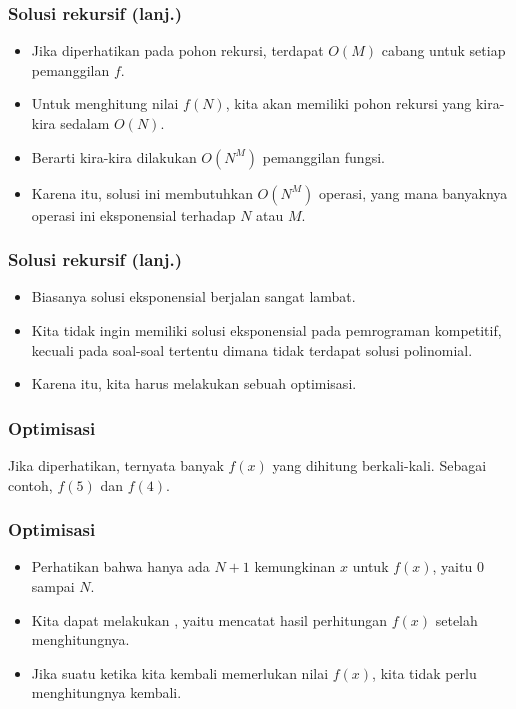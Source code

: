 \begin{frame}
\frametitle{Solusi rekursif (lanj.)}
\begin{itemize}
  \item Jika diperhatikan pada pohon rekursi, terdapat $O(M)$ cabang untuk setiap pemanggilan $f$.
  \item Untuk menghitung nilai $f(N)$, kita akan memiliki pohon rekursi yang kira-kira sedalam $O(N)$.
  \item Berarti kira-kira dilakukan $O(N^M)$ pemanggilan fungsi.
  \item Karena itu, solusi ini membutuhkan $O(N^M)$ operasi, yang mana banyaknya operasi ini eksponensial terhadap $N$ atau $M$.
\end{itemize}
\end{frame}

\begin{frame}
\frametitle{Solusi rekursif (lanj.)}
\begin{itemize}
  \item Biasanya solusi eksponensial berjalan sangat lambat.
  \item Kita tidak ingin memiliki solusi eksponensial pada pemrograman kompetitif, kecuali pada soal-soal tertentu dimana tidak terdapat solusi polinomial. 
  \item Karena itu, kita harus melakukan sebuah optimisasi.
\end{itemize}
\end{frame}

\begin{frame}
\frametitle{Optimisasi}
Jika diperhatikan, ternyata banyak $f(x)$ yang dihitung berkali-kali. Sebagai contoh, $f(5)$ dan $f(4)$.
\begin{center}
\scalebox{0.8}{
\Tree [.$f(12)$
  [.$f(2)$
    [.$f(1)$
      [.$f(0)$ ]
    ]
  ]
  [.$f(6)$
    [.$f(0)$ ]
    [.$f(5)$
      [.$f(4)$
        [.$...$
        ]
      ]
    ]
  ]
  [.$f(11)$
    [.$f(1)$
      [.$f(0)$ ]
    ]
    [.$f(5)$
      [.$f(4)$
        [.$...$          
        ]
      ]
    ]
    [.$f(10)$ 
      [.$f(0)$ 
        [.$...$ ]      
      ]
      [.$f(4)$ 
        [.$...$ ]      
      ]
      [.$f(9)$ 
        [.$...$ ]      
      ]
    ]
  ]
]
}
\end{center}
\end{frame}

\begin{frame}
\frametitle{Optimisasi}
\begin{itemize}
  \item Perhatikan bahwa hanya ada $N + 1$ kemungkinan $x$ untuk $f(x)$, yaitu $0$ sampai $N$.
  
  \item Kita dapat melakukan , yaitu mencatat hasil perhitungan $f(x)$ setelah menghitungnya.
  \item Jika suatu ketika kita kembali memerlukan nilai $f(x)$, kita tidak perlu menghitungnya kembali.
\end{itemize}
\end{frame}

